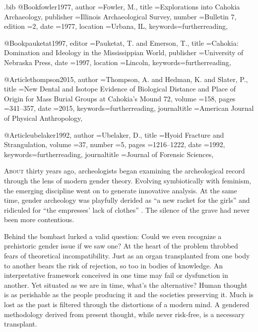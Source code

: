 \begin{filecontents}{\IJSRAidentifier.bib}
@Book{fowler1977,
	author       ={Fowler, M.},
	title        ={Explorations into Cahokia Archaeology},
	publisher    ={Illinois Archaeological Survey},
	number       ={Bulletin 7},
	edition      ={2},
	date         ={1977},
	location     ={Urbana, IL},
	keywords={furtherreading},
}

@Book{pauketat1997,
	editor       ={Pauketat, T. and Emerson, T.},
	title        ={Cahokia: Domination and Ideology in the Mississippian World},
	publisher    ={University of Nebraska Press},
	date         ={1997},
	location     ={Lincoln},	
	keywords={furtherreading},
}

@Article{thompson2015,
	author       ={Thompson, A. and Hedman, K. and Slater, P.},
	title        ={New Dental and Isotope Evidence of Biological Distance and Place of Origin for Mass Burial Groups at Cahokia’s Mound 72},
	volume       ={158},
	pages        ={341--357},
	date         ={2015},
	keywords={furtherreading},
	journaltitle ={American Journal of Physical Anthropology},
}

@Article{ubelaker1992,
	author       ={Ubelaker, D.},
	title        ={Hyoid Fracture and Strangulation},
	volume       ={37},
	number       ={5},
	pages        ={1216--1222},
	date         ={1992},
	keywords={furtherreading},
	journaltitle ={Journal of Forensic Sciences},
}

\end{filecontents}
\IJSRAopening%
\lettrine{A}{bout} thirty years ago, archeologists began examining the archeological record through the lens of modern gender theory. Evolving symbiotically with feminism, the emerging discipline went on to generate innovative analysis. At the same time, gender archeology was playfully derided as \enquote{a new racket for the girls} and ridiculed for \enquote{the empresses' lack of clothes} \parencite[321]{bahn1992}. The silence of the grave had never been more contentious. 

Behind the bombast lurked a valid question: Could we even recognize a prehistoric gender issue if we saw one? At the heart of the problem throbbed fears of theoretical incompatibility. Just as an organ transplanted from one body to another bears the risk of rejection, so too in bodies of knowledge. An interpretative framework conceived in one time may fail or dysfunction in another. Yet situated as we are in time, what's the alternative? Human thought is as perishable as the people producing it and the societies preserving it. Much is lost as the past is filtered through the distortions of a modern mind. A gendered methodology derived from present thought, while never risk-free, is a necessary transplant. 

